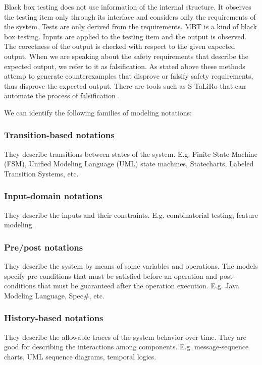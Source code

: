 Black box testing does not use information of the internal structure. It observes the testing item only through its interface and considers only the requirements of the system. Tests are only derived from the requirements. MBT is a kind of black box testing. Inputs are applied to the testing item and the output is observed. The corectness of the output is checked with respect to the given expected output. When we are speaking about the safety requirements that describe the expected output, we refer to it as falsification. As stated above these methods attemp to generate counterexamples that disprove or falsify safety requirements, thus disprove the expected output. There are tools such as S-TaLiRo that can automate the process of falsification \cite{Fainekos:sTaLiRo}.

We can identify the following families of modeling notations:

\subsubsection{Transition-based notations}

They describe transitions between states of the system. E.g. Finite-State Machine (FSM), Unified Modeling Language (UML) state machines, Statecharts, Labeled Transition Systems, etc.

\subsubsection{Input-domain notations}

They describe the inputs and their constraints. E.g. combinatorial testing, feature modeling.

\subsubsection{Pre/post notations}

They describe the system by means of some variables and operations. The models specify pre-conditions that must be satisfied before an operation and post-conditions that must be guaranteed after the operation execution. E.g. Java Modeling Language, Spec\#, etc.

\subsubsection{History-based notations}

They describe the allowable traces of the system behavior over time. They are good for describing the interactions among components. E.g. message-sequence charts, UML sequence diagrams, temporal logics.

